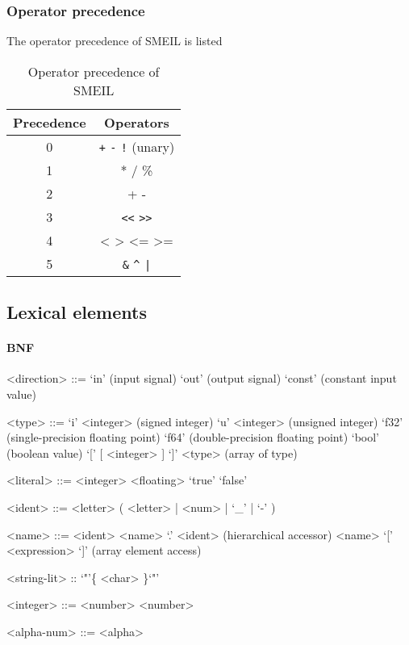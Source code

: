 \documentclass{article}
\begin{document}
\subsubsection{Operator precedence}

The operator precedence of SMEIL is listed 

\begin{table}[H]
  \centering
\begin{tabular}{cc}
  \toprule
  \textbf{Precedence} & \textbf{Operators}\\
  \midrule
  0 & \verb!+! \verb!-! \verb|!| (unary)\\
  1 & * / \% \\
  2 & + - \\
  3 & \verb!<<! \verb!>>! \\
  4 & < > <= >= \\
  5 & \verb!&! \verb!^! \verb!|! \\
  \bottomrule
\end{tabular}
\caption{Operator precedence of SMEIL}
\label{tab:ops}
\end{table}

\subsection{Lexical elements}
\paragraph{BNF}
\begin{grammar}

  <direction> ::= `in' (input signal)
  \alt `out' (output signal)
  \alt `const' (constant input value)

  <type> ::= `i' <integer> (signed integer)
  \alt `u' <integer> (unsigned integer)
  \alt `f32' (single-precision floating point)
  \alt `f64' (double-precision floating point)
  \alt `bool' (boolean value)
  \alt `[' [ <integer> ] `]' <type> (array of type)


  <literal> ::= <integer>
  \alt <floating>
  \alt `true'
  \alt `false'

  <ident> ::= <letter> ( <letter> | <num> | `_' | `-' )

  <name> ::= <ident>
  \alt <name> `.' <ident> (hierarchical accessor)
  \alt <name> `[' <expression> `]' (array element access)

  <string-lit> :: `"'\{ <char> \}`"'

  <integer> ::= <number> { <number> }

  <alpha-num> ::= <alpha>

\end{grammar}
\end{document}
